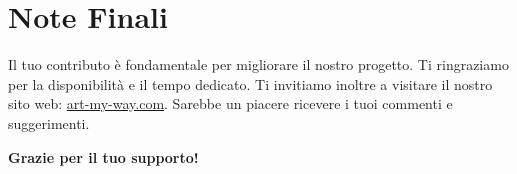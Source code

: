 \documentclass{article}
\begin{document}
\section*{Note Finali}
Il tuo contributo \`e fondamentale per migliorare il nostro progetto. Ti ringraziamo per la disponibilit\`a e il tempo dedicato.
Ti invitiamo inoltre a visitare il nostro sito web: \href{https://art-my-way.com}{art-my-way.com}. Sarebbe un piacere ricevere i tuoi commenti e suggerimenti.

\vspace{1cm}
\noindent\textbf{Grazie per il tuo supporto!}
\end{document}
